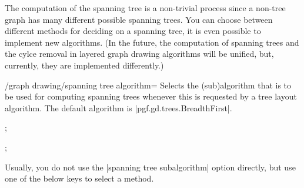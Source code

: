 The computation of the spanning tree is a non-trivial process since
a non-tree graph has many different possible spanning trees. You can
choose between different methods for deciding on a spanning tree, it
is even possible to implement new algorithms. (In the future, the
computation of spanning trees and the cylce removal in layered graph
drawing algorithms will be unified, but, currently, they are
implemented differently.) 

\begin{key}{/graph drawing/spanning tree algorithm=}
  Selects the (sub)algorithm that is to be used for computing spanning
  trees whenever this is requested by a tree layout algorithm. The
  default algorithm is |pgf.gd.trees.BreadthFirst|.
\begin{codeexample}[]
\tikz {};   
\end{codeexample}
\begin{codeexample}[]
\tikz {};   
\end{codeexample} 
\end{key}

Usually, you do not use the |spanning tree subalgorithm| option directly,
but use one of the below keys to select a method.


